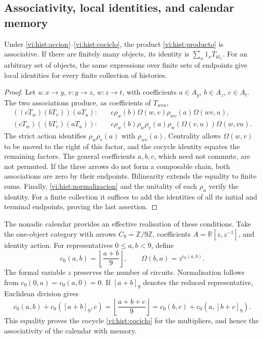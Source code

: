 \subsection{Associativity, local identities, and calendar memory}
\label{vi:hist:asociatividad}

\begin{proposition}
Under \eqref{vi:hist:accion}--\eqref{vi:hist:cociclo}, the product
\eqref{vi:hist:producto} is associative. If there are finitely many objects, its identity
is \(\sum_x1_xT_{\operatorname{id}_x}\). For an arbitrary set of objects,
the same expressions over finite sets of endpoints
give local identities for every finite collection of histories.
\end{proposition}
\begin{proof}
Let \(u:x\to y\), \(v:y\to z\), \(w:z\to t\), with coefficients
\(a\in A_y\), \(b\in A_z\), \(c\in A_t\). The two associations
produce, as coefficients of \(T_{wvu}\),
\begin{align*}
 ((cT_w)(bT_v))(aT_u):\quad&
 c\rho_w(b)\Omega(w,v)\rho_{wv}(a)\Omega(wv,u),\\
 (cT_w)((bT_v)(aT_u)):\quad&
 c\rho_w(b)\rho_w\rho_v(a)
 \rho_w(\Omega(v,u))\Omega(w,vu).
\end{align*}
The strict action identifies \(\rho_w\rho_v(a)\) with
\(\rho_{wv}(a)\). Centrality allows
\(\Omega(w,v)\) to be moved to the right of this factor, and the cocycle identity
equates the remaining factors. The general coefficients
\(a,b,c\), which need not commute, are not permuted. If the three arrows do not form a
composable chain, both associations are zero by their endpoints.
Bilinearity extends the equality to finite sums. Finally,
\eqref{vi:hist:normalizacion} and the unitality of each \(\rho_u\)
verify the identity. For a finite collection it suffices to add the identities
of all its initial and terminal endpoints, proving the last
assertion.
\end{proof}

The nonadic calendar provides an effective realisation of these
conditions. Take the one-object category with arrows
\(C_9=\mathbb Z/9\mathbb Z\), coefficients
\(A=\mathbb R[z,z^{-1}]\), and identity action. For representatives
\(0\le a,b<9\), define
\begin{equation}
 c_0(a,b)=\left\lfloor\frac{a+b}{9}\right\rfloor,
 \qquad\Omega(b,a)=z^{c_0(a,b)}.
 \label{vi:hist:carry-calendario}
\end{equation}
The formal variable \(z\) preserves the number of circuits. Normalisation
follows from \(c_0(0,a)=c_0(a,0)=0\). If \([a+b]_9\) denotes the
reduced representative, Euclidean division gives
\[
 c_0(a,b)+c_0([a+b]_9,c)
 =\left\lfloor\frac{a+b+c}{9}\right\rfloor
 =c_0(b,c)+c_0(a,[b+c]_9).
\]
This equality proves the cocycle \eqref{vi:hist:cociclo} for the
multipliers, and hence the associativity of the calendar with memory.

